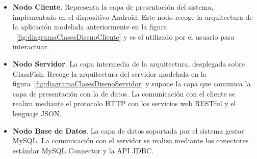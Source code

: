 \begin{itemize}
	\item \textbf{Nodo Cliente}. Representa la capa de presentación del sistema, implementado en el dispositivo Android. Este nodo recoge la arquitectura de la aplicación modelada anteriormente en la figura ~\ref{fig:diagramaClasesDisenoCliente} y es el utilizado por el usuario para interactuar.	
	\item \textbf{Nodo Servidor}. La capa intermedia de la arquitectura, desplegada sobre GlassFish. Recoge la arquitectura del servidor modelada en la figura~\ref{fig:diagramaClasesDisenoServidor} y supone la capa que comunica la capa de presentación con la de datos. La comunicación con el cliente se realiza mediante el protocolo HTTP con los servicios web RESTful y el lenguaje JSON.
	\item \textbf{Nodo Base de Datos}. La capa de datos soportada por el sistema gestor MySQL. La comunicación con el servidor se realiza mediante los conectores estándar MySQL Connector y la API JDBC.
\end{itemize}
